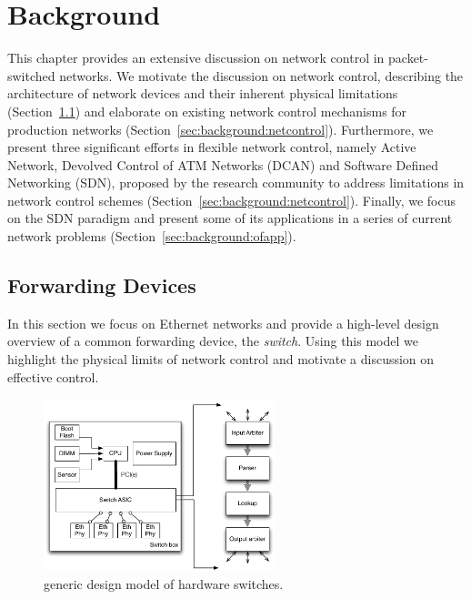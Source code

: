 \chapter{Background} \label{ch:background}

This chapter provides an extensive discussion on network control in
packet-switched networks.  We motivate the discussion on network control,
describing the architecture of network devices and their inherent physical
limitations (Section~\ref{sec:background:forwarding}) and elaborate on existing
network control mechanisms for production networks
(Section~\ref{sec:background:netcontrol}).  Furthermore, we present three
significant efforts in flexible network control, namely Active Network,
Devolved Control of ATM Networks (DCAN) and Software Defined Networking (SDN),
proposed by the research community to address limitations in network control
schemes (Section~\ref{sec:background:netcontrol}). Finally, we focus on the SDN
paradigm and present some of its applications in a series of current network
problems (Section~\ref{sec:background:ofapp}).

\section{Forwarding Devices} \label{sec:background:forwarding}

In this section we focus on Ethernet networks and provide a high-level design
overview of a common forwarding device, the \emph{switch}. Using this model we
highlight the physical limits of network control and motivate a discussion on
effective control. 

\begin{figure}
  \centering
\includegraphics[width=0.6\textwidth]{Background/BackgroundFigs/switch_design}
\caption{generic design model of hardware switches.}
\label{fig:background:switch_design}
\end{figure}

